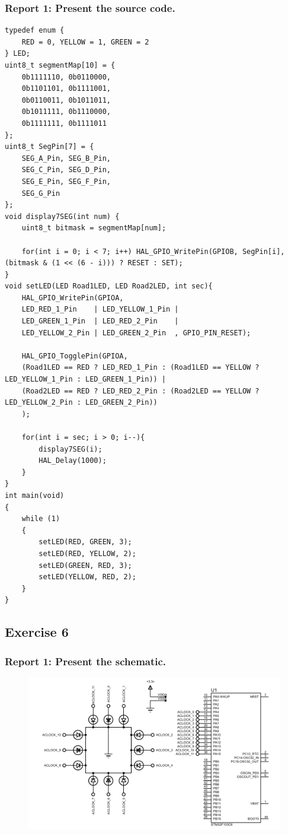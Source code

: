 \documentclass[a4paper,12pt]{article}
\begin{document}
\subsubsection{Report 1: Present the source code.}
\begin{lstlisting}
typedef enum {
	RED = 0, YELLOW = 1, GREEN = 2
} LED;
uint8_t segmentMap[10] = {
	0b1111110, 0b0110000,
	0b1101101, 0b1111001,
	0b0110011, 0b1011011,
	0b1011111, 0b1110000,
	0b1111111, 0b1111011
};
uint8_t SegPin[7] = {
	SEG_A_Pin, SEG_B_Pin,
	SEG_C_Pin, SEG_D_Pin,
	SEG_E_Pin, SEG_F_Pin,
	SEG_G_Pin
};
void display7SEG(int num) {
	uint8_t bitmask = segmentMap[num];
	
	for(int i = 0; i < 7; i++) HAL_GPIO_WritePin(GPIOB, SegPin[i], (bitmask & (1 << (6 - i))) ? RESET : SET);
}
void setLED(LED Road1LED, LED Road2LED, int sec){
	HAL_GPIO_WritePin(GPIOA,
	LED_RED_1_Pin    | LED_YELLOW_1_Pin |
	LED_GREEN_1_Pin  | LED_RED_2_Pin    |
	LED_YELLOW_2_Pin | LED_GREEN_2_Pin  , GPIO_PIN_RESET);
	
	HAL_GPIO_TogglePin(GPIOA,
	(Road1LED == RED ? LED_RED_1_Pin : (Road1LED == YELLOW ? LED_YELLOW_1_Pin : LED_GREEN_1_Pin)) |
	(Road2LED == RED ? LED_RED_2_Pin : (Road2LED == YELLOW ? LED_YELLOW_2_Pin : LED_GREEN_2_Pin))
	);
	
	for(int i = sec; i > 0; i--){
		display7SEG(i);
		HAL_Delay(1000);
	}
}
int main(void)
{
	while (1)
	{
		setLED(RED, GREEN, 3);
		setLED(RED, YELLOW, 2);
		setLED(GREEN, RED, 3);
		setLED(YELLOW, RED, 2);
	}
}
\end{lstlisting}
\newpage
\subsection{Exercise 6}
\subsubsection{Report 1: Present the schematic.}
\label{ex6r1}
\begin{figure}[H]
	\centering
	\includegraphics[width=0.95\linewidth]{Attachments/1.6.1.PDF}
\end{figure}
\end{document}
